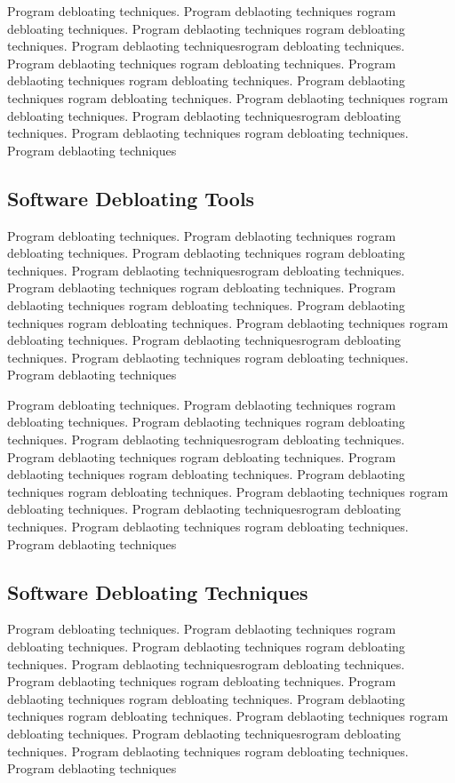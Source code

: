 \documentclass{relatorio}
\begin{document}
Program debloating techniques. Program deblaoting techniques rogram debloating techniques. Program deblaoting techniques
rogram debloating techniques. Program deblaoting techniquesrogram debloating techniques. Program deblaoting techniques
rogram debloating techniques. Program deblaoting techniques rogram debloating techniques. Program deblaoting techniques
rogram debloating techniques. Program deblaoting techniques 
rogram debloating techniques. Program deblaoting techniquesrogram debloating techniques. Program deblaoting techniques
rogram debloating techniques. Program deblaoting techniques

\subsection{Software Debloating Tools}%
\label{Tools}

Program debloating techniques. Program deblaoting techniques rogram debloating techniques. Program deblaoting techniques
rogram debloating techniques. Program deblaoting techniquesrogram debloating techniques. Program deblaoting techniques
rogram debloating techniques. Program deblaoting techniques rogram debloating techniques. Program deblaoting techniques
rogram debloating techniques. Program deblaoting techniques 
rogram debloating techniques. Program deblaoting techniquesrogram debloating techniques. Program deblaoting techniques
rogram debloating techniques. Program deblaoting techniques

Program debloating techniques. Program deblaoting techniques rogram debloating techniques. Program deblaoting techniques
rogram debloating techniques. Program deblaoting techniquesrogram debloating techniques. Program deblaoting techniques
rogram debloating techniques. Program deblaoting techniques rogram debloating techniques. Program deblaoting techniques
rogram debloating techniques. Program deblaoting techniques 
rogram debloating techniques. Program deblaoting techniquesrogram debloating techniques. Program deblaoting techniques
rogram debloating techniques. Program deblaoting techniques

\subsection{Software Debloating Techniques}%
\label{Tools}

Program debloating techniques. Program deblaoting techniques rogram debloating techniques. Program deblaoting techniques
rogram debloating techniques. Program deblaoting techniquesrogram debloating techniques. Program deblaoting techniques
rogram debloating techniques. Program deblaoting techniques rogram debloating techniques. Program deblaoting techniques
rogram debloating techniques. Program deblaoting techniques 
rogram debloating techniques. Program deblaoting techniquesrogram debloating techniques. Program deblaoting techniques
rogram debloating techniques. Program deblaoting techniques
\end{document}
